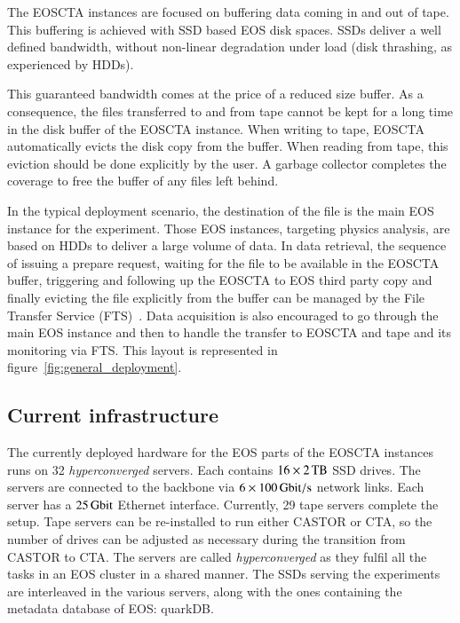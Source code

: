\documentclass{webofc}
\begin{document}
The EOSCTA instances are focused on buffering data coming in and out of tape. This buffering is achieved with SSD based
EOS disk spaces. SSDs deliver a well defined bandwidth, without non-linear degradation under load (disk thrashing,
as experienced by HDDs).

This guaranteed bandwidth comes at the price of a reduced size buffer. As a consequence, the files transferred to and from
tape cannot be kept for a long time in the disk buffer of the EOSCTA instance. When writing to tape, EOSCTA automatically
evicts the disk copy from the buffer. When reading from tape, this eviction should be done explicitly by the user. A garbage
collector completes the coverage to free the buffer of any files left behind.

In the typical deployment scenario, the destination of the file is the main EOS instance for the experiment. Those EOS instances,
targeting physics analysis, are based on HDDs to deliver a large volume of data. In data retrieval, the sequence of issuing a prepare request,
waiting for the file to be available in the EOSCTA buffer, triggering and following up the EOSCTA to EOS third party copy
and finally evicting the file explicitly from the buffer can be managed by the File Transfer Service (FTS)~\cite{fts_chep2019}. Data acquisition is
also encouraged to go through the main EOS instance and then to handle the transfer to EOSCTA and tape and its monitoring
via FTS. This layout is represented in figure~\ref{fig:general_deployment}.

\subsection{Current infrastructure}

The currently deployed hardware for the EOS parts of the EOSCTA instances runs on 32 {\em{}hyperconverged} servers.
Each contains $16\times\SI{2}{\tera\byte}$ SSD drives. The servers are connected to the backbone via 
$6\times\SI{100}{\giga\bit\per\second}$ network links. Each server has a $\SI{25}{\giga\bit}$ Ethernet interface. 
Currently, 29 tape servers complete the setup. Tape servers can be re-installed to run either CASTOR or CTA, so the
number of drives can be adjusted as necessary during the transition from CASTOR to CTA. The servers are called
{\em{}hyperconverged} as they fulfil all the tasks in an EOS cluster in a shared manner.
The SSDs serving the experiments are interleaved in the various servers, along with the ones containing the
metadata database of EOS: quarkDB. 
\end{document}
